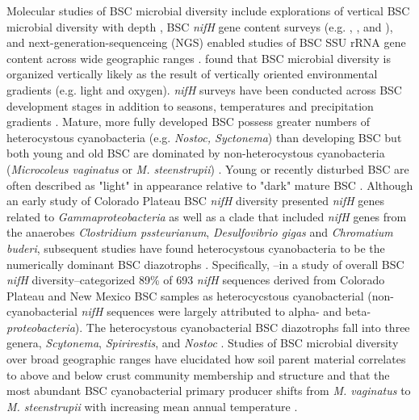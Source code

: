 Molecular studies of BSC microbial diversity include explorations of vertical BSC microbial diversity with depth \cite{Garcia_Pichel_2003}, BSC \textit{nifH} gene content surveys (e.g. \citet{14766579}, \citet{Yeager_2012}, \citet{Yeager} and \citet{Steppe_1996}), and next-generation-sequenceing (NGS) enabled studies of BSC SSU rRNA gene content across wide geographic ranges \cite{Garcia_Pichel_2013, Steven_2013}. \citet{Garcia_Pichel_2003} found that BSC microbial diversity is organized vertically likely as the result of vertically oriented environmental gradients (e.g. light and oxygen). \textit{nifH} surveys have been conducted across BSC development stages \cite{14766579} in addition to seasons, temperatures and precipitation gradients \cite{Yeager_2012}. Mature, more fully developed BSC possess greater numbers of heterocystous cyanobacteria (e.g. \textit{Nostoc, Syctonema}) than developing BSC but both young and old BSC are dominated by non-heterocystous cyanobacteria (\textit{Microcoleus vaginatus} or \textit{M. steenstrupii}) \cite{14766579, Garcia_Pichel_2013}. Young or recently disturbed BSC are often described as "light" in appearance relative to "dark" mature BSC \cite{Belnap_2002}.  Although an early study of Colorado Plateau BSC \textit{nifH} diversity presented \textit{nifH} genes related to \textit{Gammaproteobacteria} as well as a clade that included \textit{nifH} genes from the anaerobes \textit{Clostridium pssteurianum}, \textit{Desulfovibrio gigas} and \textit{Chromatium buderi}, subsequent studies have found heterocystous cyanobacteria to be the numerically dominant BSC diazotrophs \cite{Yeager, 14766579, Yeager_2012}. Specifically, \citet{Yeager}--in a study of overall BSC \textit{nifH} diversity--categorized 89\% of 693 \textit{nifH} sequences derived from Colorado Plateau and New Mexico BSC samples as heterocycstous cyanobacterial (non-cyanobacterial \textit{nifH} sequences were largely attributed to alpha- and beta- \textit{proteobacteria}). The heterocystous cyanobacterial BSC diazotrophs fall into three genera, \textit{Scytonema}, \textit{Spirirestis}, and \textit{Nostoc} \cite{Yeager, Yeager_2012}. Studies of BSC microbial diversity over broad geographic ranges have elucidated how soil parent material correlates to above and below crust community membership and structure \cite{Steven_2013} and that the most abundant BSC cyanobacterial primary producer shifts from \textit{M. vaginatus} to \textit{M. steenstrupii} with increasing mean annual temperature \cite{Garcia_Pichel_2013}.

